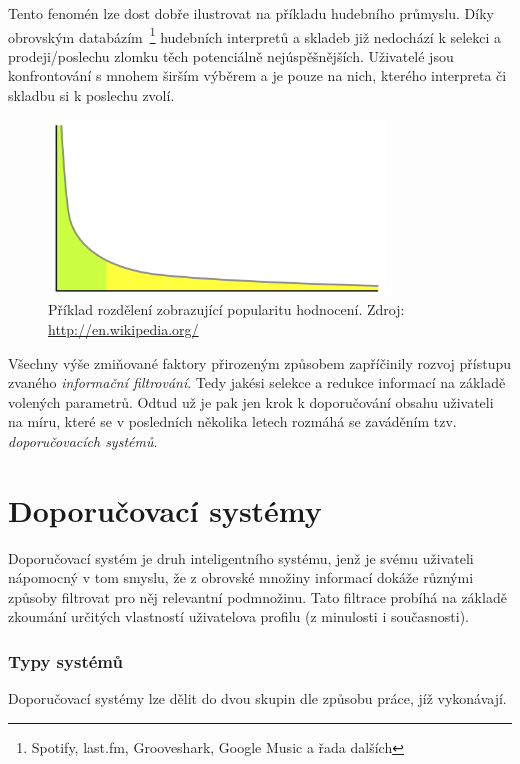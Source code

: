 \documentclass[thesis=M,czech]{FITthesis}[2014/05/07]
\begin{document}
\begin{introduction}
	Tento fenomén lze dost dobře ilustrovat na příkladu hudebního průmyslu. Díky obrovským databázím~\footnote{Spotify, last.fm, Grooveshark, Google Music a řada dalších} hudebních interpretů a skladeb již nedochází k selekci a prodeji/poslechu zlomku těch potenciálně nejúspěšnějších. Uživatelé jsou konfrontování s mnohem širším výběrem a je pouze na nich, kterého interpreta či skladbu si k poslechu zvolí.
	
\begin{figure}\centering
	\includegraphics[width=0.8\textwidth]{obr/longtail.png}
 	\caption[Příklad rozdělení zobrazující popularitu hodnocení]{Příklad rozdělení zobrazující popularitu hodnocení. Zdroj: \url{http://en.wikipedia.org/} \cite{wiki:longtail}}\label{fig:longtail}
\end{figure}	

	Všechny výše zmiňované faktory přirozeným způsobem zapříčinily rozvoj přístupu zvaného \emph{informační filtrování}. Tedy jakési selekce a redukce informací na základě volených parametrů. Odtud už je pak jen krok k doporučování obsahu uživateli na míru, které se v posledních několika letech rozmáhá se zaváděním tzv. \emph{doporučovacích systémů}.

\section{Doporučovací systémy}
\label{sub:recsys}
Doporučovací systém je druh inteligentního systému, jenž je svému uživateli nápomocný v tom smyslu, že z obrovské množiny informací dokáže různými způsoby filtrovat pro něj relevantní podmnožinu. Tato filtrace probíhá na základě zkoumání určitých vlastností uživatelova profilu (z minulosti i současnosti).
 
\subsubsection{Typy systémů}

Doporučovací systémy lze dělit do dvou skupin dle způsobu práce, jíž vykonávají. 


\end{introduction}
\end{document}
